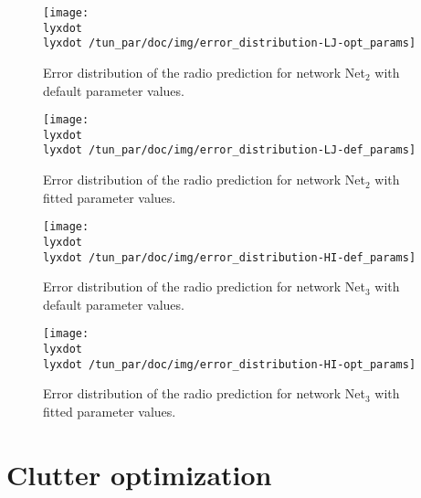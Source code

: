 \begin{figure*}
\begin{minipage}[t]{0.49\textwidth}%
\centering

\texttt{[image: \\lyxdot \\lyxdot /tun\_par/doc/img/error\_distribution-LJ-opt\_params]}

\caption{Error distribution of the radio prediction for network Net$_{2}$
with default parameter values.\label{fig:error_distribution_default_parameters-Net2}}
%
\end{minipage}\hfill{}%
\begin{minipage}[t]{0.49\textwidth}%
\centering

\texttt{[image: \\lyxdot \\lyxdot /tun\_par/doc/img/error\_distribution-LJ-def\_params]}

\caption{Error distribution of the radio prediction for network Net$_{2}$
with fitted parameter values.\label{fig:error_distribution_optimal_parameters-Net2}}
%
\end{minipage}
\end{figure*}


\begin{figure*}
\begin{minipage}[t]{0.49\textwidth}%
\centering

\texttt{[image: \\lyxdot \\lyxdot /tun\_par/doc/img/error\_distribution-HI-def\_params]}

\caption{Error distribution of the radio prediction for network Net$_{3}$
with default parameter values.\label{fig:error_distribution_default_parameters-Net3}}
%
\end{minipage}\hfill{}%
\begin{minipage}[t]{0.49\textwidth}%
\centering

\texttt{[image: \\lyxdot \\lyxdot /tun\_par/doc/img/error\_distribution-HI-opt\_params]}

\caption{Error distribution of the radio prediction for network Net$_{3}$
with fitted parameter values.\label{fig:error_distribution_optimal_parameters-Net3}}
%
\end{minipage}
\end{figure*}



\section{Clutter optimization}\label{sec:Clutter-optimization}


